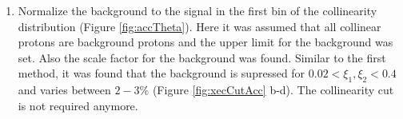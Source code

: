 \begin{enumerate}
\begin{figure}[H]
\end{figure}
	\item Normalize the background to the signal in the first bin  of the collinearity distribution (Figure \ref{fig:accTheta}). Here it was assumed that all collinear protons are background protons and the upper limit for the background was set. Also the scale factor for the background was found. Similar to the first method, it was found that the background is supressed for $0.02<\xi_1,\xi_2<0.4$ and varies between $2-3\%$ (Figure \ref{fig:xecCutAcc} b-d). The collinearity cut is not required anymore.
\begin{figure}[H]
	\centering
	\parbox{0.48\textwidth}{
		\centering
		\begin{subfigure}[b]{\linewidth}{
				}
		\end{subfigure}
	}
	\quad
	\parbox{0.48\textwidth}{
		\centering
		\begin{subfigure}[b]{\linewidth}{
				}

\end{subfigure}}
\end{figure}
\end{enumerate}
